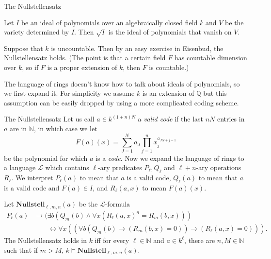 \documentclass[10pt]{beamer}
\newcommand{\NN}{\mathbb{N}}
\newcommand{\QQ}{\mathbb{Q}}
\begin{document}
\begin{frame}{The Nullstellensatz}
    \begin{theorem}
    Let $I$ be an ideal of polynomials over an algebraically closed field $k$ and $V$ be the variety determined by $I$. Then $\sqrt I$ is the ideal of polynomials that vanish on $V$.
    \end{theorem}

\pause

    Suppose that $k$ is uncountable. Then by an easy exercise in Eisenbud, the Nullstellensatz holds. (The point is that a certain field $F$ has countable dimension over $k$, so if $F$ is a proper extension of $k$, then $F$ is countable.)

\pause

    The language of rings doesn't know how to talk about ideals of polynomials, so we first expand it.
    For simplicity we assume $k$ is an extension of $\QQ$ but this assumption can be easily dropped by using a more complicated coding scheme.
\end{frame}

\begin{frame}{The Nullstellensatz}
Let us call $a \in k^{(1+n)N}$ a \emph{valid code} if the last $nN$ entries in $a$ are in $\NN$, in which case we let
$$F(a)(x) = \sum_{J=1}^N a_J \prod_{j=1}^n x_j^{a_{JN + j - 1}}$$
be the polynomial for which $a$ is a \emph{code}.
\pause
Now we expand the language of rings to a language $\mathcal L$ which contains $\ell$-ary predicates $P_\ell,Q_\ell$ and $\ell+n$-ary operations $R_\ell$.
    We interpret $P_\ell(a)$ to mean that $a$ is a valid code, $Q_\ell(a)$ to mean that $a$ is a valid code and $F(a) \in I$, and $R_\ell(a, x)$ to mean $F(a)(x)$.
\pause

    Let $\mathbf{Nullstell}_{\ell,m,n}(a)$ be the $\mathcal L$-formula
\begin{align*}
P_\ell(a) &\to (\exists b (Q_m(b) \wedge \forall x(R_\ell(a, x)^n = R_m(b, x))) \\
&\qquad \leftrightarrow \forall x((\forall b(Q_m(b) \to (R_m(b, x) = 0)) \to (R_\ell(a, x) = 0))).
\end{align*}
    The Nullstellensatz holds in $k$ iff for every $\ell \in \NN$ and $a \in k^\ell$, there are $n, M \in \NN$ such that if $m > M$, $k \models \mathbf{Nullstell}_{\ell,m,n}(a)$.
\end{frame}
\end{document}
